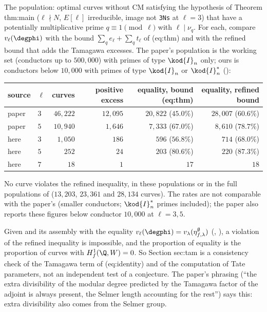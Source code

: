 \begin{example}\label{ex:blochkato:sec-tam}
The population: optimal curves without CM satisfying the hypothesis of Theorem thm:main ($\ell\nmid N$, $E[\ell]$ irreducible, image not \texttt{3Ns} at $\ell=3$) that have a
potentially multiplicative prime $q\equiv1\pmod\ell$ with $\ell\mid\nu_q$. For each, compare $v_\ell(\degphi)$ with the bound $\sum_qe_\ell+\sum_qt_\ell$ of (eq:thm) and with the
refined bound that adds the Tamagawa excesses. The paper's population is the working set (conductors up to $500{,}000$) with primes of type $\kod{I}_n$ only; ours is
conductors below $10{,}000$ with primes of type $\kod{I}_n$ or $\kod{I}_n^*$ ():
\begin{center}\small\setlength{\tabcolsep}{4pt}
\begin{tabular}{llrrrr}
\toprule
source & $\ell$ & curves & positive excess & equality, bound (eq:thm) & equality, refined bound\\
\midrule
paper & $3$ & $46{,}222$ & $12{,}095$ & $20{,}822$ ($45.0\%$) & $28{,}007$ ($60.6\%$)\\
paper & $5$ & $10{,}940$ & $1{,}646$ & $7{,}333$ ($67.0\%$) & $8{,}610$ ($78.7\%$)\\
here & $3$ & $1{,}050$ & $186$ & $596$ ($56.8\%$) & $714$ ($68.0\%$)\\
here & $5$ & $252$ & $24$ & $203$ ($80.6\%$) & $220$ ($87.3\%$)\\
here & $7$ & $18$ & $1$ & $17$ & $18$\\
\bottomrule
\end{tabular}
\end{center}
No curve violates the refined inequality, in these populations or in the full populations of  ($13{,}203$, $23{,}361$ and $28{,}134$ curves). The
rates are not comparable with the paper's (smaller conductors; $\kod{I}_n^*$ primes included); the paper also reports these figures below conductor $10{,}000$ at $\ell=3,5$.
\end{example}

\begin{remark}\label{rem:blochkato:what-sec-tam-tests}
Given  and its assembly with the equality $v_\ell(\degphi)=v_\lambda(\eta^\emptyset_{f,\lambda})$ (, ), a violation of the
refined inequality is impossible, and the proportion of equality is the proportion of curves with $H^1_f(\Q,W)=0$. So Section sec:tam is a consistency check of the
Tamagawa term of (eq:identity) and of the computation of Tate parameters, not an independent test of a conjecture. The paper's phrasing (``the extra
divisibility of the modular degree predicted by the Tamagawa factor of the adjoint is always present, the Selmer length accounting for the rest'') says this:
extra divisibility also comes from the Selmer group.
\end{remark}

